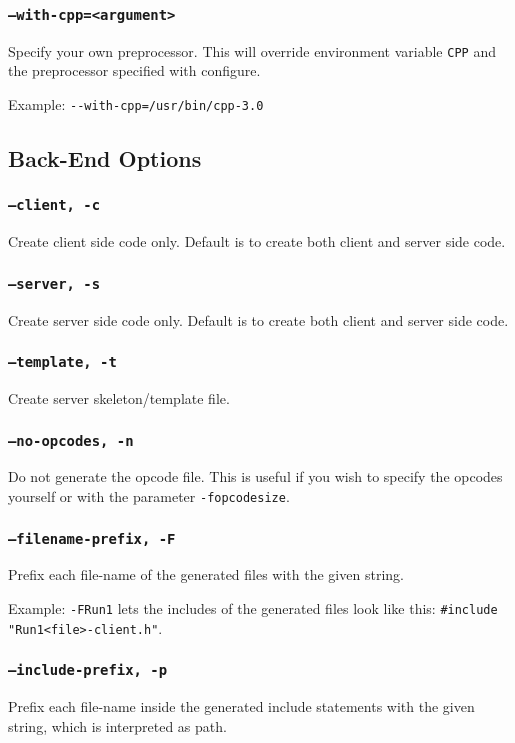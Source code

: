\subsubsection{{\tt --with-cpp=<argument>}}
Specify your own preprocessor. This will override environment
variable \verb|CPP| and the preprocessor specified with 
configure.

Example: \verb|--with-cpp=/usr/bin/cpp-3.0|

\subsection{Back-End Options}

\subsubsection{{\tt --client, -c}}
Create client side code only. Default is to create both client and server side code.

\subsubsection{{\tt --server, -s}}
Create server side code only. Default is to create both client and server side code.

\subsubsection{{\tt --template, -t}}
Create server skeleton/template file.

\subsubsection{{\tt --no-opcodes, -n}}
Do not generate the opcode file. This is useful if you wish to specify the opcodes
yourself or with the parameter {\tt -fopcodesize}.

\subsubsection{{\tt --filename-prefix, -F}}
Prefix each file-name of the \dice{} generated files with the given
string.

Example: \verb|-FRun1| lets the includes of the generated files
look like this: \verb|#include "Run1<file>-client.h"|.

\subsubsection{{\tt --include-prefix, -p}}
Prefix each file-name inside the generated include statements
with the given string, which is interpreted as path.

